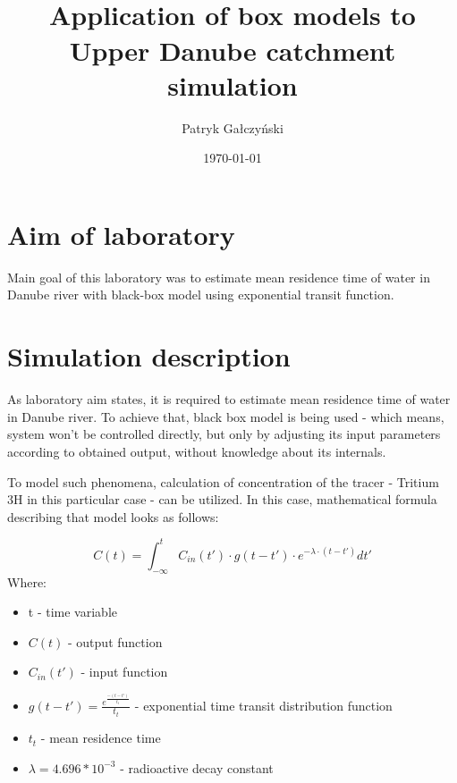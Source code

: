 \documentclass[onecolumn]{article}
\title{\spacecaps{Lab report: Lab 7 }\\
Application of box models to Upper Danube catchment simulation\\\normalsize \spacesc{Modeling of Physical Systems} }
\author{Patryk Gałczyński}
\date{\today}
\begin{document}

\maketitle


\section{Aim of laboratory}
\large
Main goal of this laboratory was to estimate mean residence time of water in Danube river with black-box model using exponential transit function.

\section{Simulation description}
As laboratory aim states, it is required to estimate mean residence time of water in Danube river. To achieve that, black box model is being used - which means, system won't be  controlled directly, but only by adjusting its input parameters according to obtained output, without knowledge about its internals.

To model such phenomena, calculation of concentration of the tracer - Tritium 3H in this particular case - can be utilized. In this case, mathematical formula describing that model looks as follows:

\begin{equation}
	C(t) = \int_{- \infty}^{t} C_{in}(t') \cdot g(t - t') \cdot e^{-\lambda \cdot (t - t')} dt'
\end{equation}
Where:
\begin{itemize}
    \item t - time variable
	\item $C(t)$ - output function
    \item $C_{in}(t')$ - input function
    \item $g(t - t') = \frac{e^{\frac{-(t-t')}{t_t}}}{t_t}$ - exponential time transit distribution function
    \item $t_t$ - mean residence time
    \item $\lambda = 4.696 * 10^{-3}$ - radioactive decay constant
\end{itemize}
\end{document}
